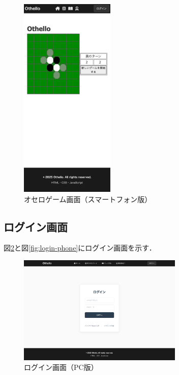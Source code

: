 \documentclass[10pt, a4paper]{jsarticle}
\begin{document}
\begin{figure}[H]
\centering
\includegraphics[width=0.4\textwidth]{img/othello-phone.png}
\caption{オセロゲーム画面（スマートフォン版）}
\label{fig:othello-phone}
\end{figure}

\subsection{ログイン画面}
図\ref{fig:login-pc}と図\ref{fig:login-phone}にログイン画面を示す．

\begin{figure}[H]
\centering
\includegraphics[width=0.7\textwidth]{img/login-pc.png}
\caption{ログイン画面（PC版）}
\label{fig:login-pc}
\end{figure}
\end{document}
